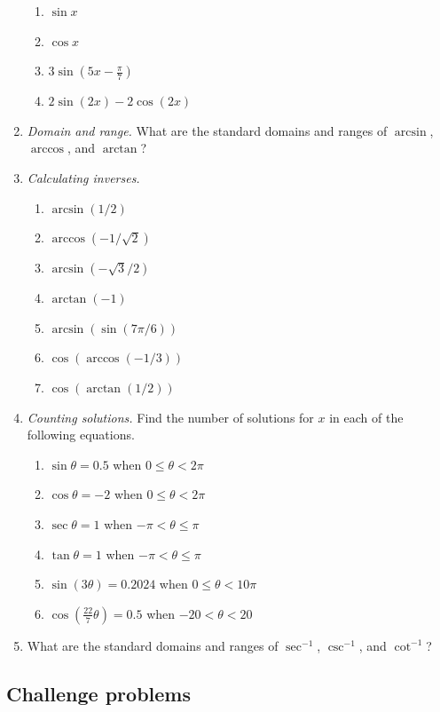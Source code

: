 \begin{enumerate}
\begin{enumerate}
\item $\sin x$
\item $\cos x$
\item $3\sin(5x - \tfrac{\pi}{7})$
\item $2\sin(2x) - 2\cos(2x)$
\end{enumerate}
\item \emph{Domain and range.} What are the standard domains and ranges of $\arcsin$, $\arccos$, and $\arctan$?\newpage
\item \emph{Calculating inverses.}
\begin{enumerate}
\item $\arcsin(1/2)$
\item $\arccos\left(-1/\sqrt{2}\right)$
\item $\arcsin\left(-\sqrt{3}/2\right)$
\item $\arctan(-1)$
\item $\arcsin(\sin(7\pi/6))$
\item $\cos(\arccos(-1/3))$
\item $\cos(\arctan(1/2))$
\end{enumerate}
\item \emph{Counting solutions.} Find the number of solutions for $x$ in each of the following equations.
\begin{enumerate}
\item $\sin\theta = 0.5$ when $0\leq\theta < 2\pi$
\item $\cos\theta = -2$ when $0\leq\theta < 2\pi$
\item $\sec\theta = 1$ when $-\pi < \theta\leq\pi$
\item $\tan\theta = 1$ when $-\pi < \theta\leq\pi$
\item $\sin(3\theta) = 0.2024$ when $0\leq\theta < 10\pi$
\item $\cos(\frac{22}{7}\theta) = 0.5$ when $-20 < \theta < 20$
\end{enumerate}
\item What are the standard domains and ranges of $\sec^{-1}$, $\csc^{-1}$, and $\cot^{-1}$?
\end{enumerate}

\subsection{Challenge problems}

